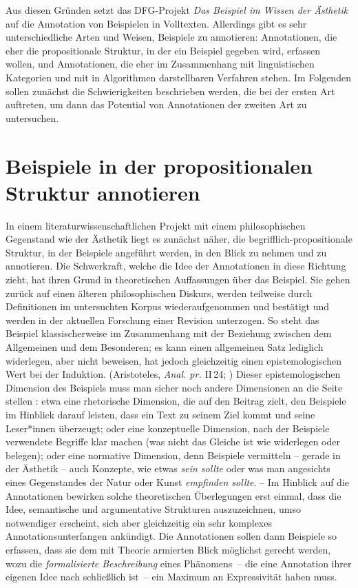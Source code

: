 \documentclass{article}
\renewcommand*{\see}{\autocap{v}gl\adddot}%
\begin{document}
Aus diesen Gründen setzt das DFG-Projekt \textit{Das Beispiel im
  Wissen der Ästhetik} auf die Annotation von Beispielen in
Volltexten. Allerdings gibt es sehr unterschiedliche Arten und Weisen,
Beispiele zu annotieren: Annotationen, die eher die propositionale
Struktur, in der ein Beispiel gegeben wird, erfassen wollen, und
Annotationen, die eher im Zusammenhang mit linguistischen Kategorien
und mit in Algorithmen darstellbaren Verfahren stehen. Im Folgenden
sollen zunächst die Schwierigkeiten beschrieben werden, die bei der
ersten Art auftreten, um dann das Potential von Annotationen der
zweiten Art zu untersuchen.

\section{Beispiele in der propositionalen Struktur annotieren}

In einem literaturwissenschaftlichen Projekt mit einem philosophischen
Gegenstand wie der Ästhetik liegt es zunächst näher, die
begrifflich-propositionale Struktur, in der Beispiele angeführt
werden, in den Blick zu nehmen und zu annotieren. Die Schwerkraft,
welche die Idee der Annotationen in diese Richtung zieht, hat ihren
Grund in theoretischen Auffassungen über das Beispiel. Sie gehen
zurück auf einen älteren philosophischen Diskurs, werden teilweise
durch Definitionen im untersuchten Korpus wiederaufgenommen und
bestätigt und werden in der aktuellen Forschung einer Revision
unterzogen. So steht das Beispiel klassischerweise im Zusammenhang mit
der Beziehung zwischen dem Allgemeinen und dem Besonderen; es kann
einen allgemeinen Satz lediglich widerlegen, aber nicht beweisen, hat
jedoch gleichzeitig einen epistemologischen Wert bei der Induktion. %
(Aristoteles, \emph{Anal. pr.} II\,24; \cite[\see][]{Willer2007a}) %
Dieser epistemologischen Dimension des Beispiels muss man sicher noch
andere Dimensionen an die Seite stellen \parencite{CL2013b}: etwa eine
rhetorische Dimension, die auf den Beitrag zielt, den Beispiele im
Hinblick darauf leisten, dass ein Text zu seinem Ziel kommt und seine
Leser*innen überzeugt; oder eine konzeptuelle Dimension, nach der
Beispiele verwendete Begriffe klar machen (was nicht das Gleiche ist
wie widerlegen oder belegen); oder eine normative Dimension, denn
Beispiele vermitteln -- gerade in der Ästhetik -- auch Konzepte, wie
etwas \emph{sein sollte} oder was man angesichts eines Gegenstandes
der Natur oder Kunst \emph{empfinden sollte}. -- Im Hinblick auf die
Annotationen bewirken solche theoretischen Überlegungen erst einmal,
dass die Idee, semantische und argumentative Strukturen auszuzeichnen,
umso notwendiger erscheint, sich aber gleichzeitig ein sehr komplexes
Annotationsunterfangen ankündigt. Die Annotationen sollen dann
Beispiele so erfassen, dass sie dem mit Theorie armierten Blick
möglichst gerecht werden, wozu die \emph{formalisierte Beschreibung}
eines Phänomens~-- die eine Annotation ihrer eigenen Idee nach
schließlich ist~-- ein Maximum an Expressivität haben muss.
\end{document}
